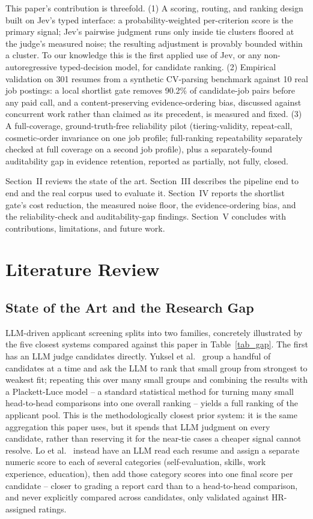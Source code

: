 \documentclass[journal]{IEEEtran}
\begin{document}
This paper's contribution is threefold. (1) A scoring, routing, and ranking design built on Jev's typed interface: a probability-weighted per-criterion score is the primary signal; Jev's pairwise judgment runs only inside tie clusters floored at the judge's measured noise; the resulting adjustment is provably bounded within a cluster. To our knowledge this is the first applied use of Jev, or any non-autoregressive typed-decision model, for candidate ranking. (2) Empirical validation on 301 resumes from a synthetic CV-parsing benchmark against 10 real job postings: a local shortlist gate removes 90.2\% of candidate-job pairs before any paid call, and a content-preserving evidence-ordering bias, discussed against concurrent work \cite{ref8} rather than claimed as its precedent, is measured and fixed. (3) A full-coverage, ground-truth-free reliability pilot (tiering-validity, repeat-call, cosmetic-order invariance on one job profile; full-ranking repeatability separately checked at full coverage on a second job profile), plus a separately-found auditability gap in evidence retention, reported as partially, not fully, closed.

Section~II reviews the state of the art. Section~III describes the pipeline end to end and the real corpus used to evaluate it. Section~IV reports the shortlist gate's cost reduction, the measured noise floor, the evidence-ordering bias, and the reliability-check and auditability-gap findings. Section~V concludes with contributions, limitations, and future work.


\section{Literature Review}

\subsection{State of the Art and the Research Gap}
LLM-driven applicant screening splits into two families, concretely illustrated by the five closest systems compared against this paper in Table~\ref{tab_gap}. The first has an LLM judge candidates directly. Yuksel et al.\ \cite{ref1} group a handful of candidates at a time and ask the LLM to rank that small group from strongest to weakest fit; repeating this over many small groups and combining the results with a Plackett-Luce model -- a standard statistical method for turning many small head-to-head comparisons into one overall ranking -- yields a full ranking of the applicant pool. This is the methodologically closest prior system: it is the same aggregation this paper uses, but it spends that LLM judgment on every candidate, rather than reserving it for the near-tie cases a cheaper signal cannot resolve. Lo et al.\ \cite{ref3} instead have an LLM read each resume and assign a separate numeric score to each of several categories (self-evaluation, skills, work experience, education), then add those category scores into one final score per candidate -- closer to grading a report card than to a head-to-head comparison, and never explicitly compared across candidates, only validated against HR-assigned ratings.
\end{document}
